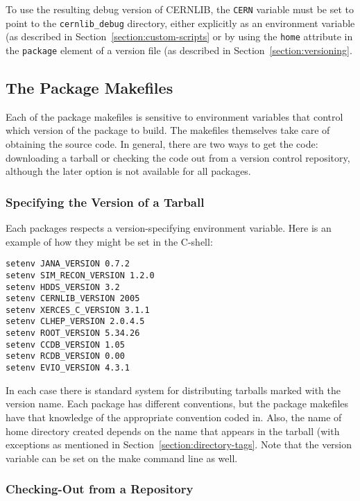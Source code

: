 \documentclass[12pt]{article}
\begin{document}
To use the resulting debug version of CERNLIB, the {\tt CERN} variable
must be set to point to the {\tt cernlib\_debug} directory, either explicitly as an environment variable (as described in Section~\ref{section:custom-scripts} or by using the {\tt home} attribute in the {\tt package} element of a version file (as described in Section~\ref{section:versioning}.

\subsection{The Package Makefiles}\label{section:package-makefiles}

Each of the package makefiles is sensitive to environment variables
that control which version of the package to build. The makefiles
themselves take care of obtaining the source code. In general, there
are two ways to get the code: downloading a tarball or checking the
code out from a version control repository, although the later option
is not available for all packages.

\subsubsection{Specifying the Version of a Tarball}

Each packages respects a version-specifying environment variable. Here
is an example of how they might be set in the C-shell:

\begin{verbatim}
setenv JANA_VERSION 0.7.2
setenv SIM_RECON_VERSION 1.2.0
setenv HDDS_VERSION 3.2
setenv CERNLIB_VERSION 2005
setenv XERCES_C_VERSION 3.1.1
setenv CLHEP_VERSION 2.0.4.5
setenv ROOT_VERSION 5.34.26
setenv CCDB_VERSION 1.05
setenv RCDB_VERSION 0.00
setenv EVIO_VERSION 4.3.1
\end{verbatim}

In each case there is standard system for distributing tarballs marked
with the version name. Each package has different conventions, but the
package makefiles have that knowledge of the appropriate convention
coded in. Also, the name of home directory created depends on the name
that appears in the tarball (with exceptions as mentioned in
Section~\ref{section:directory-tags}. Note that the version variable
can be set on the make command line as well.

\subsubsection{Checking-Out from a Repository}
\end{document}
